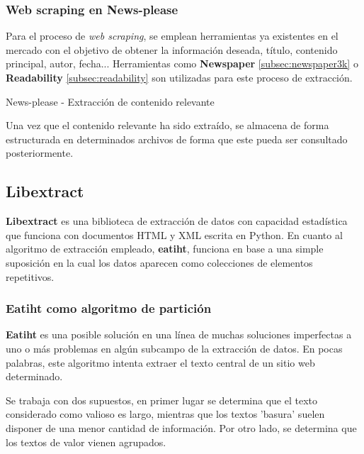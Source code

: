 \subsubsection{Web scraping en News-please}
\label{subsubsec:web scraping en news-please}

Para el proceso de \emph{web scraping}, se emplean herramientas ya existentes en el mercado con el objetivo 
de obtener la información deseada, título, contenido principal, autor, fecha... Herramientas como 
\textbf{Newspaper} \ref{subsec:newspaper3k} o \textbf{Readability} \ref{subsec:readability} son utilizadas 
para este proceso de extracción.

\begin{codefloat}
  
  \caption{News-please - Extracción de contenido relevante}
  \label{cod:news-please - extraccion de contenido relevante}
\end{codefloat}

Una vez que el contenido relevante ha sido extraído, se almacena de forma estructurada en determinados
archivos de forma que este pueda ser consultado posteriormente.

\subsection{Libextract}
\label{subsec:libextract}

\textbf{Libextract} \cite{libextract} es una biblioteca de extracción de datos con capacidad estadística
que funciona con documentos HTML y XML escrita en Python. En cuanto al algoritmo de extracción empleado,
\textbf{eatiht}, funciona en base a una simple suposición en la cual los datos aparecen como colecciones 
de elementos repetitivos.

\subsubsection{Eatiht como algoritmo de partición}
\label{subsubsec:eatiht como algoritmo de particion}

\textbf{Eatiht} \cite{eatiht} es una posible solución en una línea de muchas soluciones imperfectas a uno 
o más problemas en algún subcampo de la extracción de datos. En pocas palabras, este algoritmo intenta 
extraer el texto central de un sitio web determinado.

Se trabaja con dos supuestos, en primer lugar se determina que el texto considerado como valioso es largo, 
mientras que los textos 'basura' suelen disponer de una menor cantidad de información. Por otro lado, se 
determina que los textos de valor vienen agrupados.

